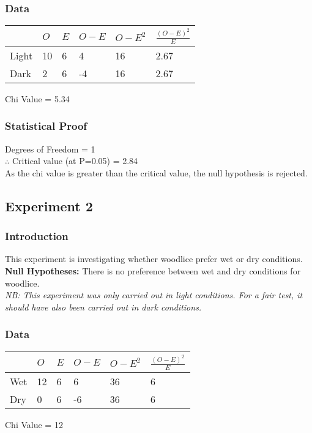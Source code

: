 \documentclass{thomasClass}
\begin{document}
\subsubsection{Data}
\begin{table}[H]
\begin{tabularx}{0.6\textwidth}{X|XXXXX}
 & $O$ & $E$ & $O-E$ & $O-E^2$ & $\frac{(O-E)^2}{E}$ \\
 \hline
Light & 10 & 6 & 4 & 16 & 2.67 \\
Dark & 2 & 6 & -4 & 16 & 2.67
\end{tabularx}
\end{table}
Chi Value = 5.34
\subsubsection{Statistical Proof}
Degrees of Freedom = 1\\
$\therefore$ Critical value (at P=0.05) = 2.84 \\
As the chi value is greater than the critical value, the null hypothesis is rejected.\\

\subsection{Experiment 2}
\subsubsection{Introduction}
This experiment is investigating whether woodlice prefer wet or dry conditions. \\
\textbf{Null Hypotheses: }There is no preference between wet and dry conditions for woodlice.\\
\textit{NB: This experiment was only carried out in light conditions. For a fair test, it should have also been carried out in dark conditions.}

\subsubsection{Data}
\begin{table}[H]
\begin{tabularx}{0.6\textwidth}{X|XXXXX}
 & $O$ & $E$ & $O-E$ & $O-E^2$ & $\frac{(O-E)^2}{E}$ \\
 \hline
Wet & 12 & 6 & 6 & 36 & 6 \\
Dry & 0 & 6 & -6 & 36 & 6
\end{tabularx}
\end{table}
Chi Value = 12
\end{document}
